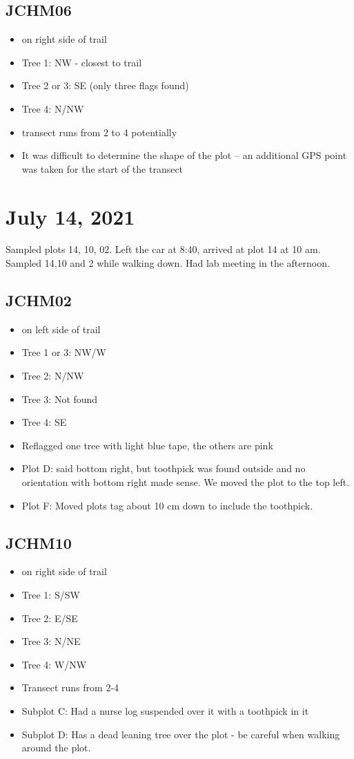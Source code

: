 \documentclass{article}\usepackage[]{graphicx}\usepackage[]{color}
\begin{document}
\subsection{JCHM06}
\begin{itemize}
\item on right side of trail
\item Tree 1: NW - closest to trail
\item Tree 2 or 3: SE (only three flags found)
\item Tree 4: N/NW 
\item transect runs from 2 to 4 potentially
\item It was difficult to determine the shape of the plot -- an additional GPS point was taken for the start of the transect
\end{itemize}

\section{July 14, 2021}
Sampled plots 14, 10, 02. Left the car at 8:40, arrived at plot 14 at 10 am. Sampled 14,10 and 2 while walking down. Had lab meeting in the afternoon.

\subsection{JCHM02}
\begin{itemize}
\item on left side of trail
\item Tree 1 or 3: NW/W
\item Tree 2: N/NW
\item Tree 3: Not found
\item Tree 4: SE
\item Reflagged one tree with light blue tape, the others are pink
\item Plot D: said bottom right, but toothpick was found outside and no orientation with bottom right made sense. We moved the plot to the top left.
\item Plot F: Moved plots tag about 10 cm down to include the toothpick.
\end{itemize}

\subsection{JCHM10}
\begin{itemize}
\item on right side of trail
\item Tree 1: S/SW
\item Tree 2: E/SE
\item Tree 3: N/NE
\item Tree 4: W/NW
\item Transect runs from 2-4
\item Subplot C: Had a nurse log suspended over it with a toothpick in it
\item Subplot D: Has a dead leaning tree over the plot - be careful when walking around the plot.
\end{itemize}
\end{document}
